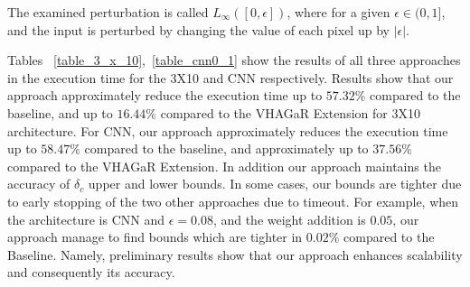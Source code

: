 The examined perturbation is called $L_\infty([0,\epsilon])$, where for a given $\epsilon\in{(0,1]}$, and the input is perturbed by changing the value of each pixel up by $|\epsilon|$.

Tables ~\ref{table_3_x_10},~\ref{table_cnn0_1} show the results of all three approaches in the execution time for the 3X10 and CNN respectively.
Results show that our approach approximately reduce the execution time up to $57.32\%$ compared to the baseline, and up to $16.44\%$ compared to the VHAGaR Extension for 3X10 architecture. 
For CNN, our approach approximately reduces the execution time up to $58.47\%$ compared to the baseline, and approximately up to $37.56\%$ compared to the VHAGaR Extension.
In addition our approach maintains the accuracy of $\delta_c$ upper and lower bounds. In some cases, our bounds are tighter due to early stopping of the two other approaches due to timeout. For example, when the architecture is CNN and $\epsilon=0.08$, and the weight addition is $0.05$, our approach manage to find bounds which are tighter in $0.02\% $ compared to the Baseline.
Namely, preliminary results show that our approach enhances scalability and consequently its accuracy.

